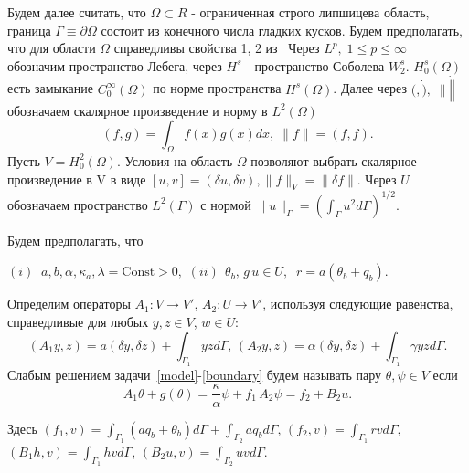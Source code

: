 Будем далее считать, что $\Omega \subset R$ - ограниченная строго липшицева область,
граница $\Gamma \equiv \partial \Omega$ состоит из конечного числа гладких кусков.
Будем предполагать, что для области $\Omega$ справедливы свойства 1, 2 из~\cite{}
Через $L^p, \; 1 \leq p \leq \infty$ обозначим пространство Лебега, через $H^s$ - пространство Соболева $W^s_2$.
$H^s_0(\Omega)$ есть замыкание $C^\infty_0(\Omega)$ по норме пространства $H^s(\Omega)$.
Далее через $(\dot, \dot), \; \| \dot \|$ обозначаем скалярное произведение и норму в $L^2(\Omega)$
\[
    (f, g) = \int_\Omega f(x)g(x)dx, \; \| f \| = (f, f).
\]
Пусть $V = H^2_0(\Omega)$.
Условия на область $\Omega$ позволяют выбрать скалярное произведение в V в виде
$[u, v] = (\delta u, \delta v), \| f \|_V = \| \delta f \|$.
Через $U$ обозначаем пространство $L^2(\Gamma)$ с нормой
$\|u\|_\Gamma=\left(\int_\Gamma u^2 d\Gamma\right)^{1/2}.$

Будем предполагать, что

$(i) \;\; a,b,\alpha,\kappa_a, \lambda =\textrm{Const} > 0 ,$
$(ii) \;\, \theta_b, \,g \, u \in U,\;\; r=a(\theta_b+q_b).$


Определим операторы $A_1\colon V \to V'$, $A_2\colon U \to V'$, используя
следующие равенства, справедливые для любых $y,z \in V$, $w\in U$:
\[
    (A_1 y,z) = a(\delta y, \delta z) + \int_{\Gamma_1} yz d\Gamma, \,
    (A_2 y, z) = \alpha (\delta y, \delta z) + \int_{\Gamma_1} \gamma yz d\Gamma.
\]
Слабым решением задачи~\eqref{model}-\eqref{boundary} будем называть
пару $\theta, \psi \in V$ если
\begin{equation}
    \label{weak}
    A_1\theta  + g(\theta) = \frac{\kappa}{\alpha} \psi + f_1 \,
    A_2\psi = f_2 + B_2 u.
\end{equation}

Здесь
$(f_1, v) = \int_{\Gamma_1} (a q_b + \theta_b)d\Gamma + \int_{\Gamma_2} a q_b d\Gamma$,
$(f_2, v) = \int_{\Gamma_1} r v d\Gamma$,
$(B_1 h,v) = \int_{\Gamma_1} h v d\Gamma$,
$(B_2 u, v) = \int_{\Gamma_2} u v d\Gamma$.


